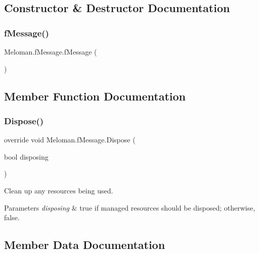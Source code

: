 \subsection{Constructor \& Destructor Documentation}
\mbox{\label{class_meloman_1_1f_message_ac2fa06bfe5a4d515f0cea78c2eafcabc}} 
\subsubsection{\texorpdfstring{fMessage()}{fMessage()}}
{\footnotesize\ttfamily Meloman.\+f\+Message.\+f\+Message (\begin{DoxyParamCaption}{ }\end{DoxyParamCaption})}



\subsection{Member Function Documentation}
\mbox{\label{class_meloman_1_1f_message_acdbb2090f3460ef3b2790cb7d1f6b16e}} 
\subsubsection{\texorpdfstring{Dispose()}{Dispose()}}
{\footnotesize\ttfamily override void Meloman.\+f\+Message.\+Dispose (\begin{DoxyParamCaption}\item[{bool}]{disposing }\end{DoxyParamCaption})\hspace{0.3cm}{\ttfamily [protected]}}



Clean up any resources being used. 


\begin{DoxyParams}{Parameters}
{\em disposing} & true if managed resources should be disposed; otherwise, false.\\
\hline
\end{DoxyParams}


\subsection{Member Data Documentation}
\mbox{\label{class_meloman_1_1f_message_a72382f0a92f831b506fb2a6f7a0f6168}} 
